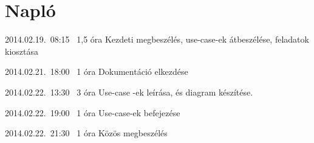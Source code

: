 %
\section{Napló}

\begin{naplo}

\bejegyzes
{2014.02.19.~08:15~}
{1,5 óra}
{\adam\newline
\antal\newline
\bator\newline
\torok}
{Kezdeti megbeszélés, use-case-ek átbeszélése, feladatok kiosztása}

\bejegyzes
{2014.02.21.~18:00~} %
{1 óra} %
{\antal} %
{Dokumentáció elkezdése} %

\bejegyzes
{2014.02.22.~13:30~}
{3 óra}
{\adam}
{Use-case -ek leírása, és diagram készítése.}

\bejegyzes
{2014.02.22.~19:00~}
{1 óra}
{\adam}
{Use-case-ek befejezése}

\bejegyzes
{2014.02.22.~21:30~}
{1 óra}
{\adam}
{Közös megbeszélés}

\end{naplo}

